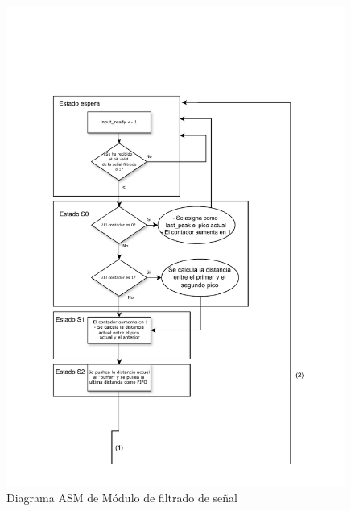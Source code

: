\begin{figure}[h!]
    \centering
    \includegraphics[width=0.99\textwidth]{./Images/img_implementacion_hw/Diagramaasmarritmias1.pdf}
    \caption{Diagrama ASM de Módulo de filtrado de señal}
    \label{fig:Diagramaasmarritmias1}
\end{figure} 

